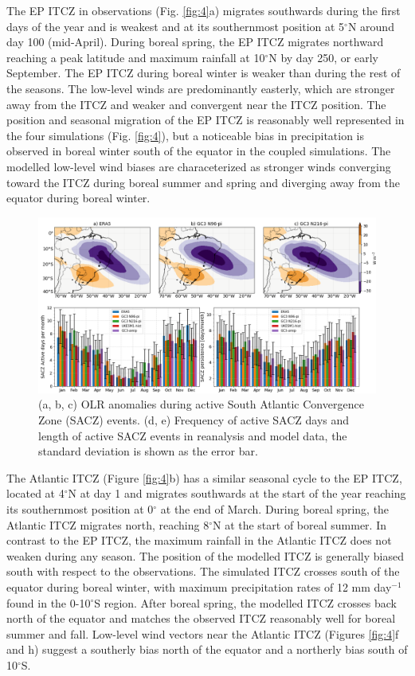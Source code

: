The EP ITCZ in observations (Fig. \ref{fig:4}a) migrates southwards during the first days of the year and is weakest and at its southernmost position at 5$^\circ$N around day 100 (mid-April).  
During boreal spring, the EP ITCZ migrates northward reaching a peak latitude and maximum rainfall at 10$^\circ$N by day 250, or early September. The EP ITCZ during boreal winter is weaker than during the rest of the seasons.
The low-level winds are predominantly easterly, which are stronger away from the ITCZ and weaker and convergent near the ITCZ position.
The position and seasonal migration of the EP ITCZ is reasonably well represented in the four simulations (Fig. \ref{fig:4}), but a noticeable bias in precipitation is observed in  boreal winter south of the equator in the coupled simulations. The modelled  low-level wind biases are characeterized as stronger winds converging toward the ITCZ during boreal summer and spring and diverging away from the equator during boreal winter. 

\begin{figure}[b!]
\includegraphics[width=\linewidth]{figures/saczanalysis.png}
\caption[SACZ assessment in UKESM1 and HadGEM3]{(a, b, c) OLR anomalies during active South Atlantic Convergence Zone (SACZ) events. (d, e) Frequency of active SACZ days and length of active SACZ events in reanalysis and model data, the standard deviation is shown as the error bar. }
\label{fig:sacz}
\end{figure}

The Atlantic ITCZ (Figure \ref{fig:4}b) has a similar seasonal cycle to the EP ITCZ, located at 4$^\circ$N at day 1 and migrates southwards at the start of the year reaching  its southernmost position at 0$^\circ$ at the end of March.
During boreal spring, the Atlantic ITCZ migrates north, reaching 8$^\circ$N at the start of boreal summer. In contrast to the EP ITCZ, the maximum rainfall in the Atlantic ITCZ does not weaken during any season. 
The position of the modelled ITCZ is generally biased south with respect to the observations.
The simulated ITCZ  crosses south of the equator during boreal winter, with maximum precipitation rates of 12 mm day$^{-1}$ found in the 0-10$^\circ$S region.
After boreal spring, the modelled ITCZ crosses back north of the equator and matches the observed ITCZ reasonably well for boreal summer and fall.
Low-level wind vectors near the Atlantic ITCZ (Figures \ref{fig:4}f and h) suggest a southerly bias north of the equator and a northerly bias south of 10$^\circ$S.

